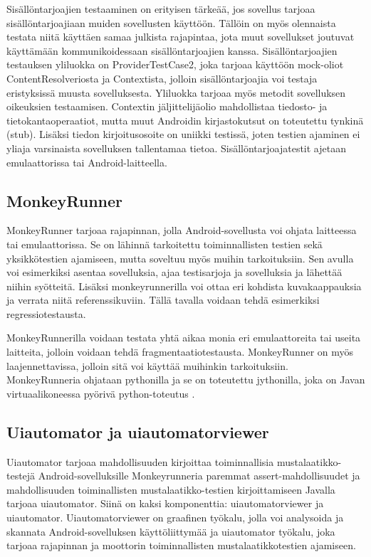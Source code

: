 Sisällöntarjoajien testaaminen on erityisen tärkeää, jos sovellus tarjoaa sisällöntarjoajiaan muiden sovellusten käyttöön. Tällöin on myös olennaista testata niitä käyttäen samaa julkista rajapintaa, jota muut sovellukset joutuvat käyttämään kommunikoidessaan sisällöntarjoajien kanssa. Sisällöntarjoajien testauksen yliluokka on ProviderTestCase2, joka tarjoaa käyttöön mock-oliot ContentResolveriosta ja Contextista, jolloin sisällöntarjoajia voi testaja eristyksissä muusta sovelluksesta. Yliluokka tarjoaa myös metodit sovelluksen oikeuksien testaamisen. Contextin jäljittelijäolio mahdollistaa tiedosto- ja tietokantaoperaatiot, mutta muut Androidin kirjastokutsut on toteutettu tynkinä (stub). Lisäksi tiedon kirjoitusosoite on uniikki testissä, joten testien ajaminen ei yliaja varsinaista sovelluksen tallentamaa tietoa. Sisällöntarjoajatestit ajetaan emulaattorissa tai Android-laitteella. \cite{android}

\subsection{MonkeyRunner}
\label{monkeyrunner}

MonkeyRunner tarjoaa rajapinnan, jolla Android-sovellusta voi ohjata laitteessa tai emulaattorissa. Se on lähinnä tarkoitettu toiminnallisten testien sekä yksikkötestien ajamiseen, mutta soveltuu myös muihin tarkoituksiin. Sen avulla voi esimerkiksi asentaa sovelluksia, ajaa testisarjoja ja sovelluksia ja lähettää niihin syötteitä. Lisäksi monkeyrunnerilla voi ottaa eri kohdista kuvakaappauksia ja verrata niitä referenssikuviin. Tällä tavalla voidaan tehdä esimerkiksi regressiotestausta.

MonkeyRunnerilla voidaan testata yhtä aikaa monia eri emulaattoreita tai useita laitteita, jolloin voidaan tehdä fragmentaatiotestausta. MonkeyRunner on myös laajennettavissa, jolloin sitä voi käyttää muihinkin tarkoituksiin. MonkeyRunneria ohjataan pythonilla ja se on toteutettu jythonilla, joka on Javan virtuaalikoneessa pyörivä python-toteutus \cite{android}.

\subsection{Uiautomator ja uiautomatorviewer}

Uiautomator tarjoaa mahdollisuuden kirjoittaa toiminnallisia mustalaatikko-testejä Android-sovelluksille Monkeyrunneria paremmat assert-mahdollisuudet ja mahdollisuuden toiminallisten mustalaatikko-testien kirjoittamiseen Javalla tarjoaa uiautomator. Siinä on kaksi komponenttia: uiautomatorviewer ja uiautomator. Uiautomatorviewer on graafinen työkalu, jolla voi analysoida ja skannata Android-sovelluksen käyttöliittymää ja uiautomator työkalu, joka tarjoaa rajapinnan ja moottorin toiminnallisten mustalaatikkotestien ajamiseen.

